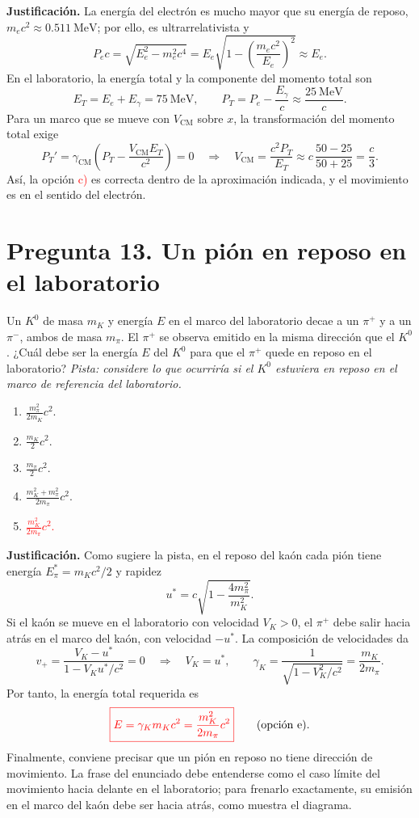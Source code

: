 \documentclass[a4paper,11pt]{article}
\newcommand{\pregunta}[2]{\section*{Pregunta #1. #2}}
\begin{document}
\textbf{Justificación.} La energía del electrón es mucho mayor que su energía de reposo, $m_ec^2\approx0.511\ \mathrm{MeV}$; por ello, es ultrarrelativista y
\[
P_ec=\sqrt{E_e^2-m_e^2c^4}
=E_e\sqrt{1-\left(\frac{m_ec^2}{E_e}\right)^2}
\approx E_e.
\]
En el laboratorio, la energía total y la componente del momento total son
\[
E_T=E_e+E_\gamma=75\ \mathrm{MeV},\qquad
P_T=P_e-\frac{E_\gamma}{c}\approx\frac{25\ \mathrm{MeV}}{c}.
\]
Para un marco que se mueve con $V_{\mathrm{CM}}$ sobre $x$, la transformación del momento total exige
\[
P_T'=\gamma_{\mathrm{CM}}\left(P_T-\frac{V_{\mathrm{CM}}E_T}{c^2}\right)=0
\quad\Longrightarrow\quad
\boxed{V_{\mathrm{CM}}=\frac{c^2P_T}{E_T}
\approx c\,\frac{50-25}{50+25}=\frac{c}{3}}.
\]
Así, la opción \textcolor{red}{c)} es correcta dentro de la aproximación indicada, y el movimiento es en el sentido del electrón.

\pregunta{13}{Un pión en reposo en el laboratorio}

Un $K^0$ de masa $m_K$ y energía $E$ en el marco del laboratorio decae a un $\pi^+$ y a un $\pi^-$, ambos de masa $m_\pi$. El $\pi^+$ se observa emitido en la misma dirección que el $K^0$. ¿Cuál debe ser la energía $E$ del $K^0$ para que el $\pi^+$ quede en reposo en el laboratorio? \emph{Pista: considere lo que ocurriría si el $K^0$ estuviera en reposo en el marco de referencia del laboratorio.}

\begin{enumerate}[itemsep=0.3em]
    \item $\displaystyle \frac{m_\pi^2}{2m_K}c^2$.
    \item $\displaystyle \frac{m_K}{2}c^2$.
    \item $\displaystyle \frac{m_\pi}{2}c^2$.
    \item $\displaystyle \frac{m_K^2+m_\pi^2}{2m_\pi}c^2$.
    \item \textcolor{red}{$\displaystyle \frac{m_K^2}{2m_\pi}c^2$.}
\end{enumerate}

\begin{figure}[H]
\centering

\end{figure}

\textbf{Justificación.} Como sugiere la pista, en el reposo del kaón cada pión tiene energía $E_\pi^*=m_Kc^2/2$ y rapidez
\[
u^*=c\sqrt{1-\frac{4m_\pi^2}{m_K^2}}.
\]
Si el kaón se mueve en el laboratorio con velocidad $V_K>0$, el $\pi^+$ debe salir hacia atrás en el marco del kaón, con velocidad $-u^*$. La composición de velocidades da
\[
v_+=\frac{V_K-u^*}{1-V_Ku^*/c^2}=0
\quad\Longrightarrow\quad V_K=u^*,
\qquad
\gamma_K=\frac{1}{\sqrt{1-V_K^2/c^2}}=\frac{m_K}{2m_\pi}.
\]
Por tanto, la energía total requerida es
\[
\textcolor{red}{\boxed{E=\gamma_Km_Kc^2=\frac{m_K^2}{2m_\pi}c^2}}
\qquad\text{(opción e).}
\]
Finalmente, conviene precisar que un pión en reposo no tiene dirección de movimiento. La frase del enunciado debe entenderse como el caso límite del movimiento hacia delante en el laboratorio; para frenarlo exactamente, su emisión en el marco del kaón debe ser hacia atrás, como muestra el diagrama.
\end{document}
